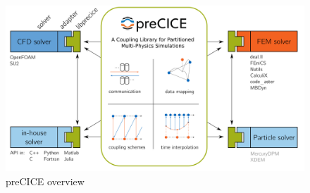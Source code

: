\begin{figure}[h]
	\centering
	\includegraphics[width=0.9 \textwidth]{images/precice-overview.png}
	\caption{preCICE overview \cite{Chourdakis:2022}}
	\label{fig:precice:overview}
\end{figure}


